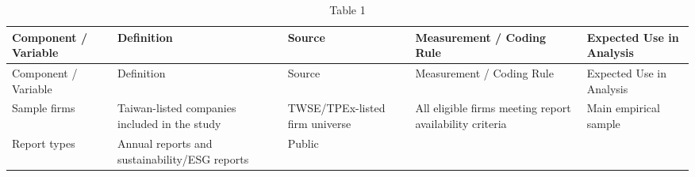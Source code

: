\documentclass[
  12pt,
]{article}
\begin{document}
\begin{longtable}[]{@{}
  >{\raggedright\arraybackslash}p{}
  >{\raggedright\arraybackslash}p{}
  >{\raggedright\arraybackslash}p{}
  >{\raggedright\arraybackslash}p{}
  >{\raggedright\arraybackslash}p{}@{}}
\caption{Table 1}\label{tbl-dataset}\tabularnewline
\toprule\noalign{}
\begin{minipage}[b]{\linewidth}\raggedright
Component / Variable
\end{minipage} & \begin{minipage}[b]{\linewidth}\raggedright
Definition
\end{minipage} & \begin{minipage}[b]{\linewidth}\raggedright
Source
\end{minipage} & \begin{minipage}[b]{\linewidth}\raggedright
Measurement / Coding Rule
\end{minipage} & \begin{minipage}[b]{\linewidth}\raggedright
Expected Use in Analysis
\end{minipage} \\
\midrule\noalign{}
\endfirsthead
\toprule\noalign{}
\begin{minipage}[b]{\linewidth}\raggedright
Component / Variable
\end{minipage} & \begin{minipage}[b]{\linewidth}\raggedright
Definition
\end{minipage} & \begin{minipage}[b]{\linewidth}\raggedright
Source
\end{minipage} & \begin{minipage}[b]{\linewidth}\raggedright
Measurement / Coding Rule
\end{minipage} & \begin{minipage}[b]{\linewidth}\raggedright
Expected Use in Analysis
\end{minipage} \\
\midrule\noalign{}
\endhead
\bottomrule\noalign{}
\endlastfoot
Sample firms & Taiwan-listed companies included in the study &
TWSE/TPEx-listed firm universe & All eligible firms meeting report
availability criteria & Main empirical sample \\
Report types & Annual reports and sustainability/ESG reports & Public

\end{longtable}
\end{document}
